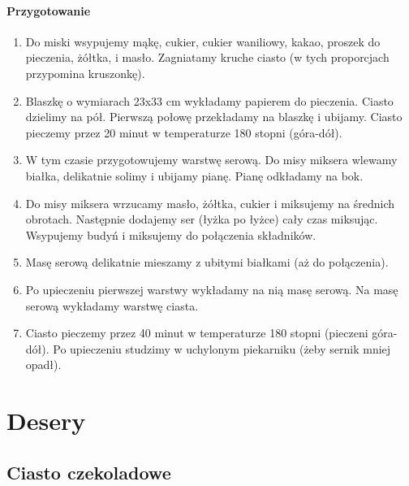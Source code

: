 \documentclass{article}
\begin{document}
    \paragraph{Przygotowanie}
    \begin{enumerate}
        \item Do miski wsypujemy mąkę, cukier, cukier waniliowy, kakao, proszek
            do pieczenia, żółtka, i masło. Zagniatamy kruche ciasto (w tych
            proporcjach przypomina kruszonkę).
        \item Blaszkę o wymiarach 23x33 cm wykładamy papierem do pieczenia.
            Ciasto dzielimy na pół. Pierwszą połowę przekładamy na blaszkę i
            ubijamy.  Ciasto pieczemy przez 20 minut w temperaturze 180 stopni
            (góra-dół).
        \item W tym czasie przygotowujemy warstwę serową. Do misy miksera
            wlewamy białka, delikatnie solimy i ubijamy pianę. Pianę odkładamy
            na bok.
        \item Do misy miksera wrzucamy masło, żółtka, cukier i miksujemy na
            średnich obrotach. Następnie dodajemy ser (łyżka po łyżce) cały czas
            miksując.  Wsypujemy budyń i miksujemy do połączenia składników.
        \item Masę serową delikatnie mieszamy z ubitymi białkami (aż do
            połączenia).
        \item Po upieczeniu pierwszej warstwy wykładamy na nią masę serową. Na
            masę serową wykładamy warstwę ciasta.
        \item Ciasto pieczemy przez 40 minut w temperaturze 180 stopni (pieczeni
            góra-dół). Po upieczeniu studzimy w uchylonym piekarniku (żeby
            sernik mniej opadł).
    \end{enumerate}
    \newpage

    \section{Desery}
    \medskip
    \subsection{Ciasto czekoladowe}
    \bigskip
\end{document}
